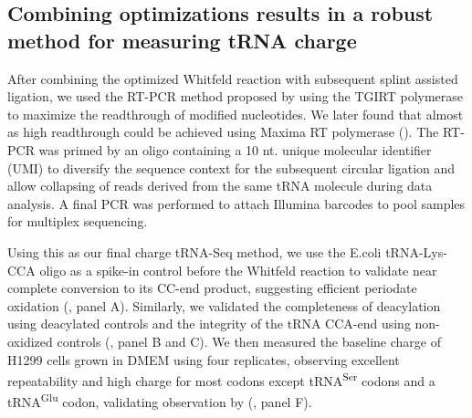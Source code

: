 \documentclass[9pt,lineno]{elife}
\begin{document}
\subsection{Combining optimizations results in a robust method for measuring tRNA charge}
After combining the optimized Whitfeld reaction with subsequent splint assisted ligation, we used the RT-PCR method proposed by \cite{Behrens2021-gb} using the TGIRT polymerase \citep{Mohr2013-hu} to maximize the readthrough of modified nucleotides.
We later found that almost as high readthrough could be achieved using Maxima RT polymerase ().
The RT-PCR was primed by an oligo containing a 10 nt. unique molecular identifier (UMI) to diversify the sequence context for the subsequent circular ligation and allow collapsing of reads derived from the same tRNA molecule during data analysis.
A final PCR was performed to attach Illumina barcodes to pool samples for multiplex sequencing.

Using this as our final charge tRNA-Seq method, we use the E.coli tRNA-Lys-CCA oligo as a spike-in control before the Whitfeld reaction to validate near complete conversion to its CC-end product, suggesting efficient periodate oxidation (, panel A).
Similarly, we validated the completeness of deacylation using deacylated controls and the integrity of the tRNA CCA-end using non-oxidized controls (, panel B and C).
We then measured the baseline charge of H1299 cells grown in DMEM using four replicates, observing excellent repeatability and high charge for most codons except tRNA\textsuperscript{Ser} codons and a tRNA\textsuperscript{Glu} codon, validating observation by \cite{Evans2017-st} (, panel F).
\end{document}
